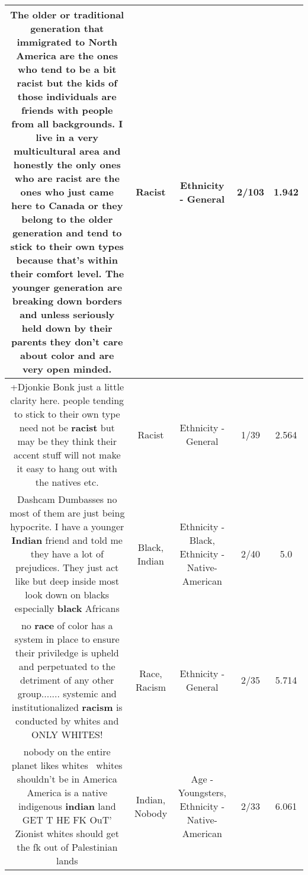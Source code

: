 \documentclass[11pt]{article}
\newlength\mylength
\begin{document}
\begin{center}
\begin{longtable}{|C{.65\mylength}|C{.30\mylength}|C{.12\mylength}|C{.12\mylength}|C{.12\mylength}|}
  \small The older or traditional generation that immigrated to North America are the ones who tend to be a bit \textbf{racist} but the kids of those individuals are friends with people from all backgrounds. I live in a very multicultural area and honestly the only ones who are \textbf{racist} are the ones who just came here to Canada or they belong to the older generation and tend to stick to their own types because that's within their comfort level. The younger generation are breaking down borders and unless seriously held down by their parents they don't care about color and are very open minded.\normalsize   & Racist & Ethnicity - General & 2/103 & 1.942 \\  \hline
  \small +Djonkie Bonk just a little clarity here. people tending to stick to their own type need not be \textbf{racist} but may be they think their accent stuff will not make it easy to hang out with the natives etc.\normalsize   & Racist & Ethnicity - General & 1/39 & 2.564 \\  \hline
  \small Dashcam Dumbasses no most of them are just being hypocrite. I have a younger \textbf{Indian} friend and told me they have a lot of prejudices. They just act like but deep inside most look down on blacks especially \textbf{black} Africans\normalsize   & Black, Indian & Ethnicity - Black, Ethnicity - Native-American & 2/40 & 5.0 \\  \hline
  \small no \textbf{race} of color has a system in place to ensure their priviledge is upheld and perpetuated to the detriment of any other group....... systemic and institutionalized \textbf{racism} is conducted by whites and ONLY WHITES!\normalsize   & Race, Racism & Ethnicity - General & 2/35 & 5.714 \\  \hline
  \small nobody on the entire planet likes whites  whites shouldn't be in America America is a native indigenous \textbf{indian} land GET T HE FK OuT' Zionist whites should get the fk out of Palestinian lands\normalsize   & Indian, Nobody & Age - Youngsters, Ethnicity - Native-American & 2/33 & 6.061 \\  \hline

\end{longtable}
\end{center}
\end{document}
